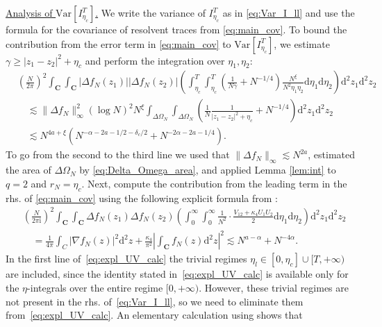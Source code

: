 \documentclass[10pt]{amsart}
\numberwithin{equation}{section}
\newcommand{\dif}{\mathrm{d}}
\newcommand{\C}{\mathbf{C}}
\newcommand{\Var}{\mathrm{Var}}
\newcommand{\ii}{\mathrm{i}}
\begin{document}
\medskip

\noindent\underline{Analysis of $\Var\left[I_{\eta_c}^{T}\right]$.} We write the variance of $I_{\eta_c}^T$ as in \eqref{eq:Var_I_ll} and use the formula for the covariance of resolvent traces from \eqref{eq:main_cov}. To bound the contribution from the error term in \eqref{eq:main_cov} to $\Var\left[I_{\eta_c}^{T}\right]$, we estimate $\gamma\ge |z_1-z_2|^2 +\eta_c$ and perform the integration over $\eta_1,\eta_2$:
\begin{equation}
\begin{split}
&\left(\frac{N}{2\pi}\right)^2 \int_\C\int_\C |\Delta f_N(z_1)||\Delta f_N(z_2)| \left(\int_{\eta_c}^T\int_{\eta_c}^T \left(\frac{1}{N\gamma}+N^{-1/4}\right)\frac{N^\xi}{N^2\eta_1\eta_2}\dif\eta_1\dif\eta_2\right)\dif^2 z_1\dif^2 z_2\\
&\quad\lesssim \|\Delta f_N\|_\infty^2 (\log N)^2 N^\xi \int_{\Delta \Omega_N}\int_{\Delta \Omega_N} \left(\frac{1}{N}\frac{1}{|z_1-z_2|^2 + \eta_c}+N^{-1/4}\right)\dif^2 z_1\dif^2 z_2\\
&\quad \lesssim N^{4a+\xi}\left(N^{-\alpha -2a-1/2-\delta_c/2}+N^{-2\alpha -2a-1/4}\right). 
\end{split}
\label{eq:Cov_err_int}
\end{equation}
To go from the second to the third line we used that $\|\Delta f_N\|_\infty\lesssim N^{2a}$, estimated the area of $\Delta\Omega_N$ by \eqref{eq:Delta_Omega_area}, and applied Lemma \ref{lem:int} to $q=2$ and $r_N=\eta_c$. Next, compute the contribution from the leading term in the rhs. of \eqref{eq:main_cov} using the following explicit formula from \cite[Lemma 4.8, Lemma 4.10]{macroCLT_complex}:
\begin{equation}
\begin{split}
&\left(\frac{N}{2\pi\ii}\right)^2 \int_\C\int_\C \Delta f_N(z_1)\Delta f_N(z_2) \left(\int_0^\infty\int_0^\infty \frac{1}{N^2}\cdot \frac{V_{12}+\kappa_4U_1U_2}{2} \dif\eta_1\dif\eta_2\right)\dif^2 z_1\dif^2 z_2\\
&\quad = \frac{1}{4\pi}\int_C |\nabla f_N(z)|^2\dif^2 z +\frac{\kappa_4}{\pi^2} \left\vert \int_\C f_N(z)\dif^2 z\right\vert^2\lesssim N^{a-\alpha} + N^{-4\alpha}.
\end{split}
\label{eq:expl_UV_calc}
\end{equation}
In the first line of~\eqref{eq:expl_UV_calc} the trivial regimes $\eta_l\in [0,\eta_c]\cup[T,+\infty)$ are included, since the identity stated in~\eqref{eq:expl_UV_calc} is available only for the $\eta$-integrals over the entire regime $[0,+\infty)$. However, these trivial regimes are not present in the rhs. of~\eqref{eq:Var_I_ll}, so we need to eliminate them from~\eqref{eq:expl_UV_calc}. An elementary calculation using \cite[Eq. (4.24)]{macroCLT_complex} shows that 
\end{document}
